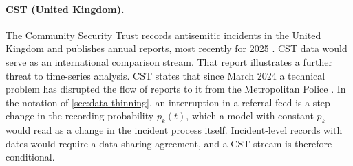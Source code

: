 \paragraph{CST (United Kingdom).}
The Community Security Trust records antisemitic incidents in the United
Kingdom and publishes annual reports, most recently for 2025
\citep{cst2026incidents}. CST data would serve as an international comparison
stream. That report illustrates a further threat to time-series analysis.
CST states that since March 2024 a technical problem has disrupted the flow
of reports to it from the Metropolitan Police \citep{cst2026incidents}. In
the notation of \cref{sec:data-thinning}, an interruption in a referral feed
is a step change in the recording probability $p_k(t)$, which a model with
constant $p_k$ would read as a change in the incident process itself.
Incident-level records with dates would require a data-sharing agreement,
and a CST stream is therefore conditional.

